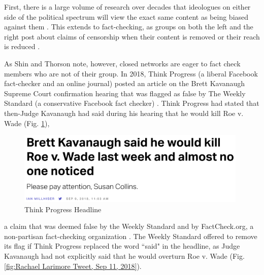 \documentclass[preprint,review,12pt]{elsarticle}
\begin{document}
 First, there is a large volume of research over decades that ideologues on either side of the political spectrum will view the exact same content as being biased against them \cite{arpan2003experimental,baum2008eye,christen2002hostile,gunther2001predicting,gunther2004mapping,baum2004issue,gussin2004eye,lee2005liberal,vallone1985hostile}. This extends to fact-checking, as groups on both the left and the right post about claims of censorship when their content is removed or their reach is reduced \cite{Dreyfuss2020Now,Post2020Facebook,Millhiser2018Facebook}. 
 
 As Shin and Thorson note, however, closed networks are eager to fact check members who are not of their group. In 2018, Think Progress (a liberal Facebook fact-checker and an online journal) posted an article on the Brett Kavanaugh Supreme Court confirmation hearing that was flagged as false by The Weekly Standard (a conservative Facebook fact checker) \cite{lybrand2018kavanaugh}. Think Progress had stated that then-Judge Kavanaugh had said during his hearing that he would kill Roe v. Wade (Fig. \ref{fig:Think Progress Headline})\cite{millhiser2018brett},
  \begin{figure}[h]
    \centering
    \includegraphics[width=11cm]{ThinkProgress Headline.png}
    \caption{Think Progress Headline \cite{millhiser2018brett}}
    \label{fig:Think Progress Headline}
\end{figure} a claim that was deemed false by the Weekly Standard and by FactCheck.org, a non-partisan fact-checking organization \cite{gore2018kavanaugh}. The Weekly Standard offered to remove its flag if Think Progress replaced the word ``said" in the headline, as Judge Kavanaugh had not explicitly said that he would overturn Roe v. Wade (Fig. \ref{fig:Rachael Larimore Tweet, Sep 11, 2018}).
 
\end{document}
